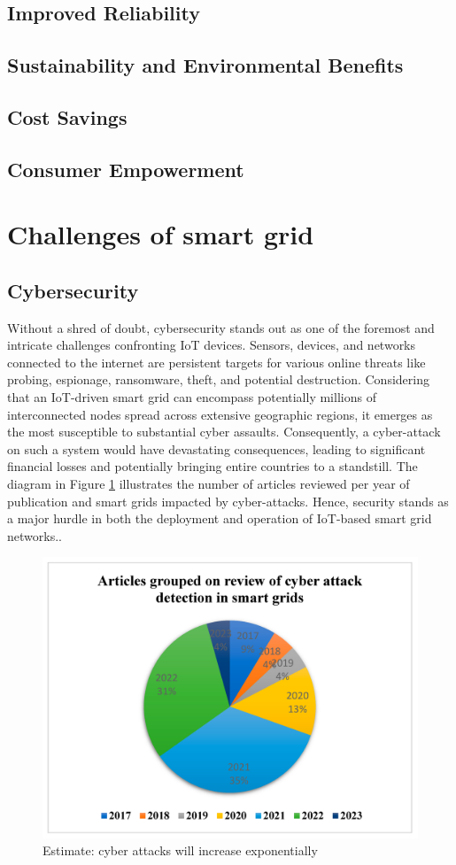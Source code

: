 \subsection{Improved Reliability}
\subsection{Sustainability and Environmental Benefits}
\subsection{Cost Savings}
\subsection{Consumer Empowerment}
\section{Challenges of smart grid }  
\subsection{Cybersecurity}
Without a shred of doubt, cybersecurity stands out as one of the foremost and intricate challenges confronting IoT devices. Sensors, devices, and networks connected to the internet are persistent targets for various online threats like probing, espionage, ransomware, theft, and potential destruction. Considering that an IoT-driven smart grid can encompass potentially millions of interconnected nodes spread across extensive geographic regions, it emerges as the most susceptible to substantial cyber assaults. Consequently, a cyber-attack on such a system would have devastating consequences, leading to significant financial losses and potentially bringing entire countries to a standstill. The diagram in Figure \ref{fig:attacks} illustrates the number of articles reviewed per year of publication and smart grids impacted by cyber-attacks. Hence, security stands as a major hurdle in both the deployment and operation of IoT-based smart grid networks.\cite{kimani2019cyber}.
\begin{figure}[h]
	\centering
	\includegraphics[width=12cm]{figures/attack.png}
	\caption{Estimate: cyber attacks will increase exponentially \cite{mdpi-link}}
	\label{fig:attacks}
\end{figure}
\newpage
